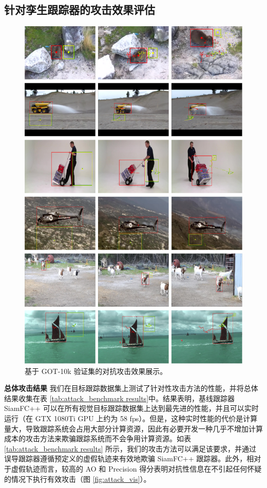 \subsection{针对孪生跟踪器的攻击效果评估}
\begin{figure}[p]
\centering
\includegraphics[width=1.0\textwidth]{Img/attack/txt_visualize.pdf}
\caption{基于 GOT-10k \cite{GOT-10k} 验证集的对抗攻击效果展示。}
\end{figure}

\textbf{总体攻击结果} 我们在目标跟踪数据集上测试了针对性攻击方法的性能，并将总体结果收集在表 \ref{tab:attack_benchmark results}中。结果表明，基线跟踪器 SiamFC++ 可以在所有视觉目标跟踪数据集上达到最先进的性能，并且可以实时运行（在 GTX 1080Ti GPU 上约为 58 fps）。但是，这种实时性能的代价是计算量大，导致跟踪系统会占用大部分计算资源，因此有必要开发一种几乎不增加计算成本的攻击方法来欺骗跟踪系统而不会争用计算资源。如表 \ref{tab:attack_benchmark results} 所示，我们的攻击方法可以满足该要求，并通过误导跟踪器遵循预定义的虚假轨迹来有效地欺骗 SiamFC++ 跟踪器。此外，相对于虚假轨迹而言，较高的 AO 和 Precision 得分表明对抗性信息在不引起任何怀疑的情况下执行有效攻击（图 \ref{fig:attack_vis}）。

